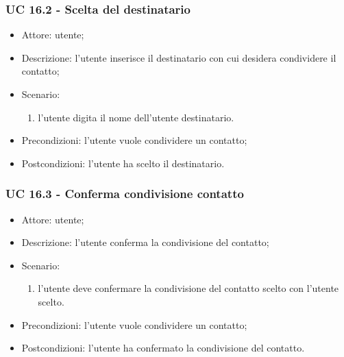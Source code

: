 \subsubsection{UC 16.2 - Scelta del destinatario} \label{sec: UC 16.2}
\begin{itemize}
    \item Attore: utente;
    \item Descrizione: l'utente inserisce il destinatario con cui desidera condividere il contatto;
    \item Scenario:
        \begin{enumerate}
        \item l'utente digita il nome dell'utente destinatario.
        \end{enumerate}
    
    \item Precondizioni: l'utente vuole condividere un contatto;
    \item Postcondizioni: l'utente ha scelto il destinatario.
\end{itemize}


\subsubsection{UC 16.3 - Conferma condivisione contatto} \label{sec: UC 16.3}
\begin{itemize}
    \item Attore: utente;
    \item Descrizione: l'utente conferma la condivisione del contatto;
    \item Scenario:
        \begin{enumerate}
        \item l'utente deve confermare la condivisione del contatto scelto con l'utente scelto.
        \end{enumerate}
    
    \item Precondizioni: l'utente vuole condividere un contatto;
    \item Postcondizioni: l'utente ha confermato la condivisione del contatto.
\end{itemize}

